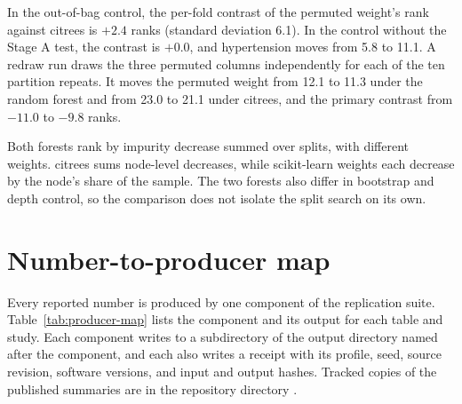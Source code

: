 \documentclass[11pt]{article}
\newcommand{\pkg}[1]{{\normalfont\fontseries{b}\selectfont #1}}
\newcommand{\code}[1]{\texttt{\detokenize{#1}}}
\newcommand{\citrees}{\pkg{citrees}\xspace}
\newcommand{\sklearn}{\pkg{scikit-learn}\xspace}
\begin{document}
In the out-of-bag control, the per-fold contrast of the permuted weight's
rank against \citrees is $+2.4$ ranks (standard deviation 6.1). In the
control without the Stage A test, the contrast is $+0.0$, and hypertension
moves from 5.8 to 11.1. A redraw run draws the three permuted columns
independently for each of the ten partition repeats. It moves the permuted
weight from 12.1 to 11.3 under the random forest and from 23.0 to 21.1 under
\citrees, and the primary contrast from $-11.0$ to $-9.8$ ranks.

Both forests rank by impurity decrease summed over splits, with different
weights. \citrees sums node-level decreases, while \sklearn weights each
decrease by the node's share of the sample. The two forests also differ in
bootstrap and depth control, so the comparison does not isolate the split
search on its own.

\section{Number-to-producer map} \label{sec:producer-map}

Every reported number is produced by one component of the replication suite.
Table~\ref{tab:producer-map} lists the component and its output for each
table and study. Each component writes to a subdirectory of the output
directory named after the component, and each also writes a receipt with its
profile, seed, source revision, software versions, and input and output
hashes. Tracked copies of the published summaries are in the repository
directory \code{paper/results/tables}.
\end{document}

